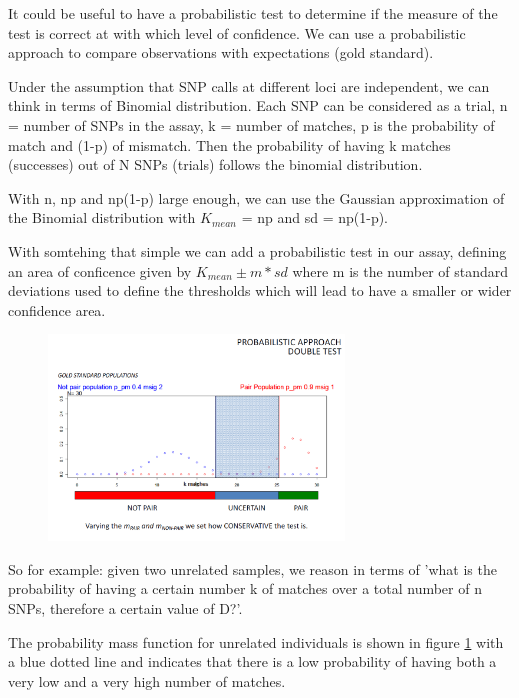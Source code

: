 It could be useful to have a probabilistic test to determine if the measure of the test is correct at with which level of confidence. We can use a probabilistic approach to compare observations with expectations (gold standard).

\bigskip
Under the assumption that SNP calls at different loci are independent, we can think in terms of Binomial distribution. Each SNP can be considered as a trial, n = number of SNPs in the assay, k = number of matches, p is the probability of match and (1-p) of mismatch. Then the probability of having k matches (successes) out of N SNPs (trials) follows the binomial distribution.

With n, np and np(1-p) large enough, we can use the Gaussian approximation of the Binomial distribution with $K_{mean}$ = np and sd = np(1-p). 

With somtehing that simple we can add a probabilistic test in our assay, defining an area of conficence given by $K_{mean} \pm m * sd$ where m is the number of standard deviations used to define the thresholds which will lead to have a smaller or wider confidence area. 

\begin{figure}
	\centering
	\includegraphics[width=0.7\textwidth]{Images/Prob_test.PNG}
	\caption{\label{fig:prob_test}}
\end{figure}

\bigskip
So for example: given two unrelated samples, we reason in terms of 'what is the probability of having a certain number k of matches over a total number of n SNPs, therefore a certain value of D?'. 

The probability mass function for unrelated individuals is shown in figure \ref{fig:prob_test} with a blue dotted line and indicates that there is a low probability of having both a very low and a very high number of matches. 

